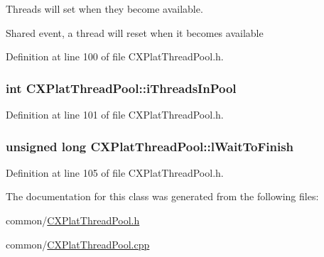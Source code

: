 \-Threads will set when they become available. 

\-Shared event, a thread will reset when it becomes available 

\-Definition at line 100 of file \-C\-X\-Plat\-Thread\-Pool.\-h.

\hypertarget{class_c_x_plat_thread_pool_a2ee5c38caa32b73ea9ccb2688edbebd3}{
\subsubsection[{i\-Threads\-In\-Pool}]{\setlength{\rightskip}{0pt plus 5cm}int {\bf \-C\-X\-Plat\-Thread\-Pool\-::i\-Threads\-In\-Pool}}}\label{class_c_x_plat_thread_pool_a2ee5c38caa32b73ea9ccb2688edbebd3}


\-Definition at line 101 of file \-C\-X\-Plat\-Thread\-Pool.\-h.

\hypertarget{class_c_x_plat_thread_pool_a29b4385ed2ab6e48190f2f8ebcd656a2}{
\subsubsection[{l\-Wait\-To\-Finish}]{\setlength{\rightskip}{0pt plus 5cm}unsigned long {\bf \-C\-X\-Plat\-Thread\-Pool\-::l\-Wait\-To\-Finish}}}\label{class_c_x_plat_thread_pool_a29b4385ed2ab6e48190f2f8ebcd656a2}


\-Definition at line 105 of file \-C\-X\-Plat\-Thread\-Pool.\-h.



\-The documentation for this class was generated from the following files\-:\begin{DoxyCompactItemize}
\item 
common/\hyperlink{_c_x_plat_thread_pool_8h}{\-C\-X\-Plat\-Thread\-Pool.\-h}\item 
common/\hyperlink{_c_x_plat_thread_pool_8cpp}{\-C\-X\-Plat\-Thread\-Pool.\-cpp}\end{DoxyCompactItemize}
